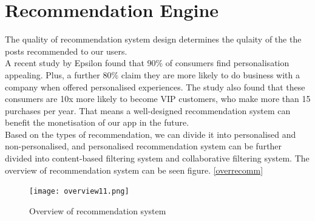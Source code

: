 
\chapter{Recommendation Engine}%
\label{Chapter6} %


The quality of recommendation system design determines the qulaity of the the posts recommended to our users.
\\ A recent study by Epsilon found that 90\% of consumers find personalisation appealing. Plus, a further 80\% claim they are more likely to do business with a company when offered personalised experiences.
The study also found that these consumers are 10x more likely to become VIP customers, who make more than 15 purchases per year. 
That means a well-designed recommendation system can benefit the monetisation of our app in the future.
\\Based on the types of recommendation, we can divide it into personalised and non-personalised, and personalised recommendation system can be further divided into content-based filtering system and collaborative filtering system. 
The overview of recommendation system can be seen figure. \autoref{overrecomm}
\begin{figure}[ht]
\centering
\texttt{[image: overview11.png]}
\caption{Overview of recommendation system}
\label{overrecomm}
\end{figure}


